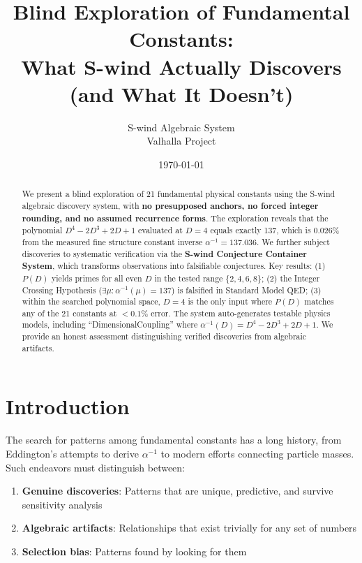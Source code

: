 \documentclass[11pt,a4paper]{article}
\title{Blind Exploration of Fundamental Constants:\\What S-wind Actually Discovers (and What It Doesn't)}
\author{S-wind Algebraic System\\Valhalla Project}
\date{\today}
\begin{document}
\maketitle

\begin{abstract}
We present a blind exploration of 21 fundamental physical constants using the S-wind algebraic discovery system, with \textbf{no presupposed anchors, no forced integer rounding, and no assumed recurrence forms}. The exploration reveals that the polynomial $D^4 - 2D^3 + 2D + 1$ evaluated at $D=4$ equals exactly 137, which is 0.026\% from the measured fine structure constant inverse $\alpha^{-1} = 137.036$. We further subject discoveries to systematic verification via the \textbf{S-wind Conjecture Container System}, which transforms observations into falsifiable conjectures. Key results: (1) $P(D)$ yields primes for all even $D$ in the tested range $\{2,4,6,8\}$; (2) the Integer Crossing Hypothesis ($\exists \mu: \alpha^{-1}(\mu) = 137$) is falsified in Standard Model QED; (3) within the searched polynomial space, $D=4$ is the only input where $P(D)$ matches any of the 21 constants at $<0.1\%$ error. The system auto-generates testable physics models, including ``DimensionalCoupling'' where $\alpha^{-1}(D) = D^4 - 2D^3 + 2D + 1$. We provide an honest assessment distinguishing verified discoveries from algebraic artifacts.
\end{abstract}

\section{Introduction}

The search for patterns among fundamental constants has a long history, from Eddington's attempts to derive $\alpha^{-1}$ to modern efforts connecting particle masses. Such endeavors must distinguish between:
\begin{enumerate}
    \item \textbf{Genuine discoveries}: Patterns that are unique, predictive, and survive sensitivity analysis
    \item \textbf{Algebraic artifacts}: Relationships that exist trivially for any set of numbers
    \item \textbf{Selection bias}: Patterns found by looking for them
\end{enumerate}
\end{document}
